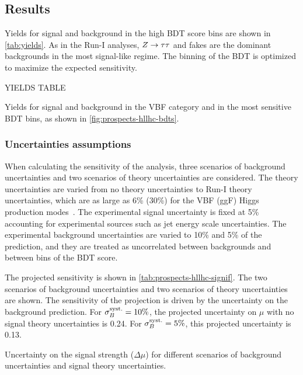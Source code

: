 \subsection{Results}

Yields for signal and background in the high BDT score bins are shown in \cref{tab:yields}. As in the Run-I analyses, $Z\rightarrow\tau\tau$ and fakes are the dominant backgrounds in the most signal-like regime. The binning of the BDT is optimized to maximize the expected sensitivity.

YIELDS TABLE

\begin{table}[!htpb]
  \centering
  \renewcommand{\arraystretch}{1.4}
  \caption{Yields for signal and background in the VBF category and in the most sensitive BDT bins, as shown in \cref{fig:prospects-hllhc-bdts}.}
  
  \label{tab:prospects-hllhc-yields}
\end{table}

\subsubsection{Uncertainties assumptions}

When calculating the sensitivity of the analysis, three scenarios of background uncertainties and two scenarios of theory uncertainties are considered. The theory uncertainties are varied from no theory uncertainties to Run-I theory uncertainties, which are as large as 6\% (30\%) for the VBF (ggF) Higgs production modes~\cite{HIGG-2013-32}. The experimental signal uncertainty is fixed at 5\% accounting for experimental sources such as jet energy scale uncertainties. The experimental background uncertainties are varied to 10\% and 5\% of the prediction, and they are treated as uncorrelated between backgrounds and between bins of the BDT score.

The projected sensitivity is shown in \cref{tab:prospects-hllhc-signif}. The two scenarios of background uncertainties and two scenarios of theory uncertainties are shown. The sensitivity of the projection is driven by the uncertainty on the background prediction. For $\sigma_{B}^{\text{syst.}} = 10\%$, the projected uncertainty on $\mu$ with no signal theory uncertainties is 0.24. For $\sigma_{B}^{\text{syst.}} = 5\%$, this projected uncertainty is 0.13.

\begin{table}[!htpb]
  \centering
  \renewcommand{\arraystretch}{1.4}
  \caption{Uncertainty on the signal strength ($\Delta\mu$) for different scenarios of background uncertainties and signal theory uncertainties.}
  
  \label{tab:prospects-hllhc-signif}
\end{table}


